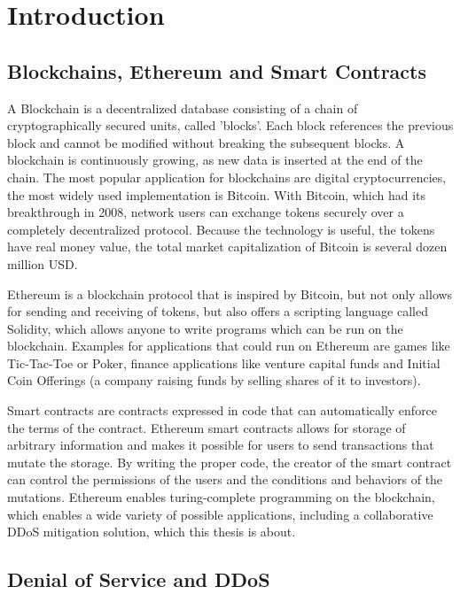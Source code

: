 \chapter{Introduction}

\section{Blockchains, Ethereum and Smart Contracts}

A Blockchain is a decentralized database consisting of a chain of cryptographically secured units, called 'blocks'. Each block references the previous block and cannot be modified without breaking the subsequent blocks. A blockchain is continuously growing, as new data is inserted at the end of the chain.
The most popular application for blockchains are digital cryptocurrencies, the most widely used implementation is Bitcoin. With Bitcoin, which had its breakthrough in 2008, network users can exchange tokens securely over a completely decentralized protocol. Because the technology is useful, the tokens have real money value, the total market capitalization of Bitcoin is several dozen million USD.
 
Ethereum \cite{Ethereum} is a blockchain protocol that is inspired by Bitcoin, but not only allows for sending and receiving of tokens, but also offers a scripting language called Solidity, which allows anyone to write programs which can be run on the blockchain. Examples for applications that could run on Ethereum are games like Tic-Tac-Toe or Poker, finance applications like venture capital funds and Initial Coin Offerings (a company raising funds by selling shares of it to investors).

Smart contracts are contracts expressed in code that can automatically enforce the terms of the contract. Ethereum smart contracts allows for storage of arbitrary information and makes it possible for users to send transactions that mutate the storage. By writing the proper code, the creator of the smart contract can control the permissions of the users and the conditions and behaviors of the mutations. Ethereum enables turing-complete programming on the blockchain, which enables a wide variety of possible applications, including a collaborative DDoS mitigation solution, which this thesis is about.

\section{Denial of Service and DDoS}

